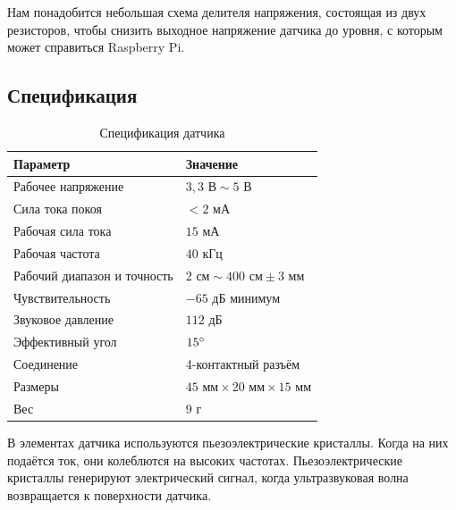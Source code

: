 \documentclass[a4paper, 14pt]{article}
\begin{document}
Нам понадобится небольшая схема делителя напряжения, состоящая из двух резисторов, чтобы снизить выходное напряжение датчика до уровня, с которым может справиться Raspberry Pi.

\newpage
\subsection{Спецификация}

\begin{table}[h!]
	\centering
	\begin{tabular}{ll}
		\toprule
		\textbf{Параметр}           & \textbf{Значение}                                           \\
		\midrule
		Рабочее напряжение          & \(3,3 \text{ В} \sim 5 \text{ В}\)                          \\
		Сила тока покоя             & \(<2\text{ мА}\)                                            \\
		Рабочая сила тока           & \(15\text{ мА}\)                                            \\
		Рабочая частота             & \(40\text{ кГц}\)                                           \\
		Рабочий диапазон и точность & \(2 \text{ см} \sim 400 \text{ см} \pm 3 \text{ мм}\)       \\
		Чувствительность            & \(-65 \text{ дБ}\) минимум                                  \\
		Звуковое давление           & \(112 \text{ дБ}\)                                          \\
		Эффективный угол            & \(15 \degree\)                                              \\
		Соединение                  & 4-контактный разъём                                         \\
		Размеры                     & \(45 \text{ мм} \times 20 \text{ мм} \times 15 \text{ мм}\) \\
		Вес                         & \(9 \text{ г}\)                                             \\
		\bottomrule
	\end{tabular}
	\caption{Спецификация датчика}
\end{table}

В элементах датчика используются пьезоэлектрические кристаллы.
Когда на них подаётся ток, они колеблются на высоких частотах.
Пьезоэлектрические кристаллы генерируют электрический сигнал, когда
ультразвуковая волна возвращается к поверхности датчика.
\end{document}
